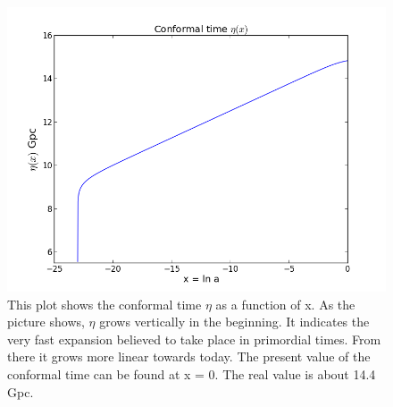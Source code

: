 \documentclass[norsk,a4paper,12pt]{article}
\begin{document}
\begin{figure}[H] 
\begin{center} 
\includegraphics[scale=0.5]{eta.png} 
 

\caption{This plot shows the conformal time $\eta$ as a function of x. As the picture shows, $\eta$ grows vertically in the beginning. It indicates the very fast expansion believed to take place in primordial times. From there it grows more linear towards today. The present value of the conformal time can be found at x = 0. The real value is about 14.4 Gpc.} 
\end{center} 
\end{figure}
\end{document}
